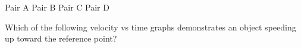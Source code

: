 \documentclass[]{exam}
\begin{document}
\begin{questions}
{\color{white}
\begin{randomizeoneparchoices}[norandomize,]
    \choice Pair A
    \correctchoice Pair B
    \choice Pair C
    \choice Pair D
\end{randomizeoneparchoices}
}

\question 
Which of the following velocity vs time graphs demonstrates an object speeding up toward the reference point?

\begin{center}
\end{center}

\vspace{1ex}


\end{questions}
\end{document}
